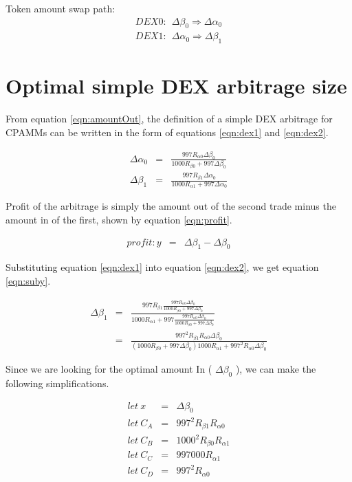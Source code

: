\documentclass[runningheads]{llncs}
\begin{document}
	Token amount swap path:
	\begin{eqnarray}
		DEX0: \: \: \Delta\beta_{0} \Rightarrow \Delta\alpha_{0}\\
		DEX1: \: \: \Delta\alpha_{0} \Rightarrow \Delta\beta_{1}
	\end{eqnarray}
	
	\section{Optimal simple DEX arbitrage size}
	From equation \ref{eqn:amountOut}, the definition of a simple DEX arbitrage for CPAMMs can be written in the form of equations \ref{eqn:dex1} and \ref{eqn:dex2}.
	
	\begin{eqnarray}
		 \Delta\alpha_{0}  &=& \frac{997 R_{\alpha 0} \Delta\beta_{0} }{1000 R_{\beta 0} + 997 \Delta\beta_{0}} \label{eqn:dex1}\\
		 \Delta\beta_{1}  &=& \frac{997 R_{\beta 1} \Delta\alpha_{0} }{1000 R_{\alpha 1} + 997 \Delta\alpha_{0}} \label{eqn:dex2}
	\end{eqnarray}
	
	Profit of the arbitrage is simply the amount out of the second trade minus the amount in of the first, shown by equation \ref{eqn:profit}.
	
	\begin{eqnarray}
		profit: y  &=& \Delta\beta_{1} - \Delta\beta_{0} \label{eqn:profit}
	\end{eqnarray}
	
	
	Substituting equation \ref{eqn:dex1} into equation \ref{eqn:dex2}, we get equation \ref{eqn:suby}.
	
	\begin{eqnarray}
		\Delta\beta_{1}  &=& \frac{997 R_{\beta 1} \frac{997 R_{\alpha 0} \Delta\beta_{0} }{1000 R_{\beta 0} + 997 \Delta\beta_{0}} }{1000 R_{\alpha 1} + 997 \frac{997 R_{\alpha 0} \Delta\beta_{0} }{1000 R_{\beta 0} + 997 \Delta\beta_{0}}} \label{eqn:suby}\\
		&=& \frac{997^2 R_{\beta 1}  R_{\alpha 0} \Delta\beta_{0} }{(1000 R_{\beta 0} + 997 \Delta\beta_{0}) 1000 R_{\alpha 1} + 997^2 R_{\alpha 0} \Delta\beta_{0} } \label{eqn:subyMore}
	\end{eqnarray}
	
	Since we are looking for the optimal amount In ( \(\Delta\beta_{0}\) ), we can make the following simplifications.
	
	\begin{eqnarray}
		let \: x &=& \Delta\beta_{0}\\
		let \: C_{A} &=& 997^2 R_{\beta 1}  R_{\alpha 0}\\
		let \: C_{B} &=& 1000^2 R_{\beta 0} R_{\alpha 1}\\
		let \: C_{C} &=& 997000  R_{\alpha 1}\\
		let \: C_{D} &=& 997^2  R_{\alpha 0}
	\end{eqnarray}
	
\end{document}
